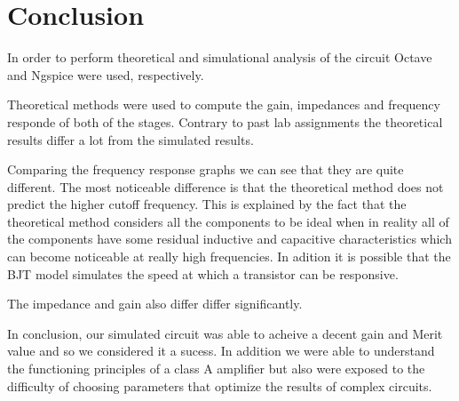 
\section{Conclusion}
\label{sec:conclusion}



In order to perform theoretical and simulational analysis of the circuit Octave and Ngspice were used, respectively.


Theoretical methods were used to compute the gain, impedances and frequency responde of both of the stages. Contrary to past lab assignments the theoretical results differ a lot from the simulated results.

Comparing the frequency response graphs we can see that they are quite different. The most noticeable difference is that the theoretical method does not predict the higher cutoff frequency. This is explained by the fact that the theoretical method considers all the components to be ideal when in reality all of the components have some residual inductive and capacitive characteristics which can become noticeable at really high frequencies. In adition it is possible that the BJT model simulates the speed at which a transistor can be responsive.

The impedance and gain also differ differ significantly.

In conclusion, our simulated circuit was able to acheive a decent gain and Merit value and so we considered it a sucess. In addition we were able to understand the functioning principles of a class A amplifier but also were exposed to the difficulty of choosing parameters that optimize the results of complex circuits.

